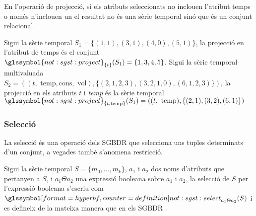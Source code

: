 En l'operació de projecció, si els
atributs seleccionats no inclouen l'atribut temps o només n'inclouen
un el resultat no és una sèrie temporal sinó que és un conjunt
relacional. 






\begin{example}
  Sigui la sèrie temporal $S_1=\{(1,1),(3,1),(4,0),(5,1)\}$, la
  projecció en l'atribut de temps és el conjunt
  $\glssymbol{not:sgst:project}_{\{t\}}(S_1) = \{ 1,3,4,5 \}$.  Sigui
  la sèrie temporal multivaluada $S_2 = ( (t,\text{ temp},\text{
    cons},\text{ vol}),\{ (2,1,2,3), (3,2,1,0), (6,1,2,3) \})$, la
  projecció en els atributs $t$ i \emph{temp} és la sèrie temporal
  $\glssymbol{not:sgst:project}_{ \{t,\text{temp}\}}(S_1) = (
  (t,\text{ temp}),\{ (2,1), (3,2), (6,1) \})$
\end{example}




\subsubsection{Selecció}

La selecció és una operació dels \gls{SGBDR} que selecciona uns tuples
determinats d'un conjunt, a vegades també s'anomena restricció.


\begin{definition}[selecció]
  Sigui la sèrie temporal $S=\{ m_0,\dotsc,m_k\}$, $a_1$ i $a_2$ dos
  noms d'atributs que pertanyen a $S$, i $a_1 \Theta a_2$ una
  expressió booleana sobre $a_1$ i $a_2$, la selecció de $S$ per
  l'expressió booleana s'escriu com
  $\glssymboldef{not:sgst:select}_{a_1 \Theta a_2}(S)$  i es defineix
  de la mateixa manera que en els
  \gls{SGBDR} \parencite[cap.~7]{date04:introduction8}.
\end{definition}

